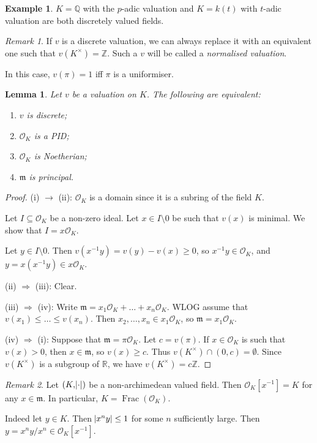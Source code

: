 \documentclass[11pt]{article}
\theoremstyle{definition}
\newtheorem*{example}{Example}
\theoremstyle{plain}
\newtheorem{lemma}[definition]{Lemma}
\theoremstyle{remark}
\newtheorem*{remark}{Remark}
\DeclareMathOperator{\Frac}{Frac}
\newcommand{\ZZ}{\mathbb{Z}}
\newcommand{\QQ}{\mathbb{Q}}
\newcommand{\RR}{\mathbb{R}}
\newcommand{\cO}{\mathcal{O}}
\newcommand{\fm}{\mathfrak{m}}
\begin{document}
\begin{example}
    $K = \QQ$ with the $p$-adic valuation and $K = k(t)$ with $t$-adic valuation are both discretely valued fields.
\end{example}

\begin{remark}
    If $v$ is a discrete valuation, we can always replace it with an equivalent one such that $v(K^\times) = \ZZ$. Such a $v$ will be called a \emph{normalised valuation}.

    In this case, $v(\pi) = 1$ iff $\pi$ is a uniformiser.
\end{remark}

\begin{lemma}\label{lem:2_6}
    Let $v$ be a valuation on $K$. The following are equivalent:
    \begin{enumerate}
        \item $v$ is discrete;
        \item $\cO_K$ is a PID;
        \item $\cO_K$ is Noetherian;
        \item $\fm$ is principal.
    \end{enumerate}
\end{lemma}
\begin{proof}
    (i) $\rightarrow$ (ii): $\cO_K$ is a domain since it is a subring of the field $K$.

    Let $I \subseteq \cO_K$ be a non-zero ideal. Let $x \in I \setminus 0$ be such that $v(x)$ is minimal. We show that $I = x \cO_K$.

    Let $y \in I \setminus 0$. Then $v(x^{-1} y) = v(y) - v(x) \ge 0$, so $x^{-1} y \in \cO_K$, and $y = x(x^{-1} y) \in x \cO_K$.

    \noindent (ii) $\Rightarrow$ (iii): Clear.

    \noindent (iii) $\Rightarrow$ (iv): Write $\fm = x_1 \cO_K + \ldots + x_n \cO_K$. WLOG assume that $v(x_1) \le \ldots \le v(x_n)$. Then $x_2, \ldots, x_n \in x_1 \cO_K$, so $\fm = x_1 \cO_K$.

    \noindent (iv) $\Rightarrow$ (i): Suppose that $\fm = \pi \cO_K$. Let $c = v(\pi)$. If $x \in \cO_K$ is such that $v(x) > 0$, then $x \in \fm$, so $v(x) \ge c$. Thus $v(K^\times) \cap (0, c) = \emptyset$. Since $v(K^\times)$ is a subgroup of $\RR$, we have $v(K^\times) = c \ZZ$.
\end{proof}

\begin{remark}
    Let $(K, \abs{\cdot})$ be a non-archimedean valued field. Then $\cO_K[x^{-1}] = K$ for any $x \in \fm$. In particular, $K = \Frac(\cO_K)$.

    Indeed let $y \in K$. Then $\abs{x^n y} \le 1$ for some $n$ sufficiently large. Then $y = x^n y / x^n \in \cO_K[x^{-1}]$.
\end{remark}
\end{document}
